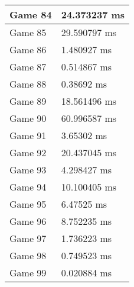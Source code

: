 \begin{tabular}{|l|l|}
	Game 84 & 24.373237 ms \\ \hline
	Game 85 & 29.590797 ms \\ \hline
	Game 86 & 1.480927 ms \\ \hline
	Game 87 & 0.514867 ms \\ \hline
	Game 88 & 0.38692 ms \\ \hline
	Game 89 & 18.561496 ms \\ \hline
	Game 90 & 60.996587 ms \\ \hline
	Game 91 & 3.65302 ms \\ \hline
	Game 92 & 20.437045 ms \\ \hline
	Game 93 & 4.298427 ms \\ \hline
	Game 94 & 10.100405 ms \\ \hline
	Game 95 & 6.47525 ms \\ \hline
	Game 96 & 8.752235 ms \\ \hline
	Game 97 & 1.736223 ms \\ \hline
	Game 98 & 0.749523 ms \\ \hline
	Game 99 & 0.020884 ms \\ \hline
\end{tabular}
